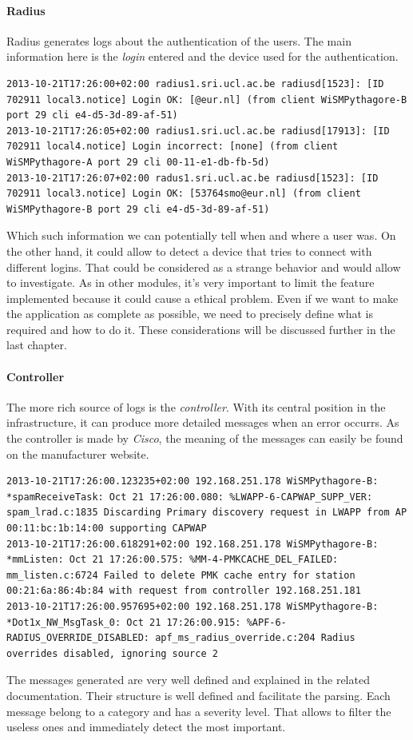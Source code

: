\paragraph{Radius}
Radius generates logs about the authentication of the users. The main information here is the \emph{login} entered and the device used for the authentication.
\begin{lstlisting}[frame=single,breaklines=true,caption={\texttt{RADIUS} logs}]
2013-10-21T17:26:00+02:00 radius1.sri.ucl.ac.be radiusd[1523]: [ID 702911 local3.notice] Login OK: [@eur.nl] (from client WiSMPythagore-B port 29 cli e4-d5-3d-89-af-51)
2013-10-21T17:26:05+02:00 radius1.sri.ucl.ac.be radiusd[17913]: [ID 702911 local4.notice] Login incorrect: [none] (from client WiSMPythagore-A port 29 cli 00-11-e1-db-fb-5d)
2013-10-21T17:26:07+02:00 radus1.sri.ucl.ac.be radiusd[1523]: [ID 702911 local3.notice] Login OK: [53764smo@eur.nl] (from client WiSMPythagore-B port 29 cli e4-d5-3d-89-af-51)
\end{lstlisting}
Which such information we can potentially tell when and where a user was. On the other hand, it could allow to detect a device that tries to connect with different logins. That could be considered as a strange behavior and would allow to investigate. As in other modules, it's very important to limit the feature implemented because it could cause a ethical problem. Even if we want to make the application as complete as possible, we need to precisely define what is required and how to do it. These considerations will be discussed further in the last chapter.

\paragraph{Controller}
The more rich source of logs is the \emph{controller}. With its central position in the infrastructure, it can produce more detailed messages when an error occurrs. As the controller is made by \emph{Cisco}, the meaning of the messages can easily be found on the manufacturer website\cite{syslogCisco}.
\begin{lstlisting}[frame=single,breaklines=true,caption={Controller logs}]
2013-10-21T17:26:00.123235+02:00 192.168.251.178 WiSMPythagore-B: *spamReceiveTask: Oct 21 17:26:00.080: %LWAPP-6-CAPWAP_SUPP_VER: spam_lrad.c:1835 Discarding Primary discovery request in LWAPP from AP 00:11:bc:1b:14:00 supporting CAPWAP
2013-10-21T17:26:00.618291+02:00 192.168.251.178 WiSMPythagore-B: *mmListen: Oct 21 17:26:00.575: %MM-4-PMKCACHE_DEL_FAILED: mm_listen.c:6724 Failed to delete PMK cache entry for station 00:21:6a:86:4b:84 with request from controller 192.168.251.181
2013-10-21T17:26:00.957695+02:00 192.168.251.178 WiSMPythagore-B: *Dot1x_NW_MsgTask_0: Oct 21 17:26:00.915: %APF-6-RADIUS_OVERRIDE_DISABLED: apf_ms_radius_override.c:204 Radius overrides disabled, ignoring source 2 
\end{lstlisting}
The messages generated are very well defined and explained in the related documentation. Their structure is well defined and facilitate the parsing. Each message belong to a category and has a severity level. That allows to filter the useless ones and immediately detect the most important.

